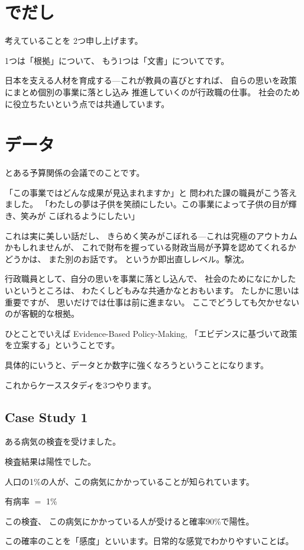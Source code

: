 \documentclass[uplatex,jis2004,dvipdfmx,12pt]{jsarticle}
\begin{document}
\section{でだし}
考えていることを
2つ申し上げます。

1つは「根拠」について、
もう1つは「文書」についてです。


日本を支える人材を育成する---これが教員の喜びとすれば、
自らの思いを政策にまとめ個別の事業に落とし込み
推進していくのが行政職の仕事。
社会のために役立ちたいという点では共通しています。


\section{データ}
とある予算関係の会議でのことです。

「この事業ではどんな成果が見込まれますか」と
問われた課の職員がこう答えました。
「わたしの夢は子供を笑顔にしたい。この事業によって子供の目が輝き、笑みが
こぼれるようにしたい」

これは実に美しい話だし、
きらめく笑みがこぼれる---これは究極のアウトカムかもしれませんが、
これで財布を握っている財政当局が予算を認めてくれるかどうかは、
また別のお話です。
というか即出直しレベル。撃沈。




行政職員として、自分の思いを事業に落とし込んで、
社会のためになにかしたいというところは、
わたくしどもみな共通かなとおもいます。
たしかに思いは重要ですが、
思いだけでは仕事は前に進まない。
ここでどうしても欠かせないのが客観的な根拠。

ひとことでいえば
Evidence-Based Policy-Making,
「エビデンスに基づいて政策を立案する」ということです。

具体的にいうと、データとか数字に強くなろうということになります。

これからケーススタディを3つやります。

\subsection{Case Study 1}

ある病気の検査を受けました。

検査結果は陽性でした。

人口の1\%の人が、この病気にかかっていることが知られています。

有病率 $=$ 1\%

この検査、
この病気にかかっている人が受けると確率90\%で陽性。

この確率のことを「感度」といいます。日常的な感覚でわかりやすいことば。
\end{document}
